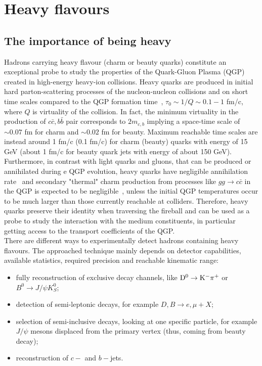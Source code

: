 
\chapter{Heavy flavours} %

\label{Chapter2} %

\section{The importance of being heavy}
Hadrons carrying heavy flavour (charm or beauty quarks) constitute an exceptional probe to study 
the properties of the Quark-Gluon Plasma (QGP) created in high-energy heavy-ion collisions. Heavy quarks are produced in initial hard parton-scattering processes
of the nucleon-nucleon collisions and on short time scales compared to the QGP formation time~\cite{Liu:2012ax},
$\tau_0 \sim 1/Q \sim 0.1-1$ fm/c, where $Q$ is virtuality of the collision. In fact,
the minimum virtuality in the production of $c\bar{c}, b\bar{b}$ pair corresponds to $2 m_{c,b}$
implying a space-time scale of $\sim 0.07$ fm for charm and $\sim 0.02$ fm for beauty. Maximum
reachable time scales are instead around 1 fm/c (0.1 fm/c) for charm (beauty) quarks with energy of 15 GeV (about 1 fm/c for beauty quark jets with energy of about 150 GeV).
Furthermore, in contrast with light quarks and gluons, that can be produced or annihilated 
during e QGP evolution, heavy quarks have negligible annihilation rate~\cite{BraunMunzinger:2007tn} and secondary "thermal" 
charm production from processes like $gg \rightarrow c\bar{c}$ in the QGP is expected to be negligible~\cite{Zhang:2007dm}, 
unless the initial QGP temperatures occur to be much larger than those currently reachable at colliders. Therefore,
heavy quarks preserve their identity when traversing the fireball and can be used as a probe
to study the interaction with the medium constituents, in particular getting access to the 
transport coefficients of the QGP.\\
There are different ways to experimentally detect hadrons containing heavy flavours. The approached technique
mainly depends on detector capabilities, available statistics, required precision and reachable kinematic
range:
\begin{itemize}
\item fully reconstruction of exclusive decay channels, like ${\rm D^0\to K^-\pi^+}$ or $B^0 \rightarrow J/\psi K^0_S$;
\item detection of semi-leptonic decays, for example $D, B \rightarrow e, \mu + X$;
\item selection of semi-inclusive decays, looking at one specific particle, for example $J/\psi$ mesons displaced from the primary vertex (thus, coming from beauty decay);
\item reconstruction of $c-$ and $b-$jets.
\end{itemize}
